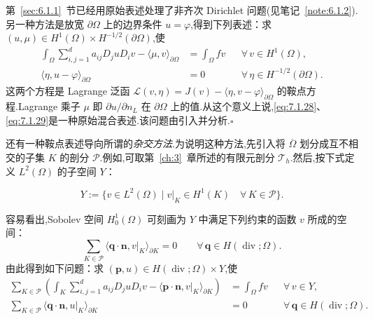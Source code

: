 \begin{note}
第~\ref{sec:6.1.1}~节已经用原始表述处理了非齐次 Dirichlet 问题(见笔记~\ref{note:6.1.2}).另一种方法是放宽 \(\partial\Omega\) 上的边界条件 \(u=\varphi\),得到下列表述：求 \((u,\mu)\in H^1(\Omega)\times H^{-1/2}(\partial\Omega)\),使
\begin{align}
  \int_\Omega\sum_{i,j=1}^d a_{ij}D_juD_iv-\langle\mu,v\rangle_{\partial\Omega}
    &=\int_\Omega fv &&\forall\,v\in H^1(\Omega),\label{eq:7.1.28}\\
  \langle\eta,u-\varphi\rangle_{\partial\Omega}
    &=0 &&\forall\,\eta\in H^{-1/2}(\partial\Omega).\label{eq:7.1.29}
\end{align}
这两个方程是 Lagrange 泛函 \(\mathcal L(v,\eta)=J(v)-\langle\eta,v-\varphi\rangle_{\partial\Omega}\) 的鞍点方程.Lagrange 乘子 \(\mu\) 即 \(\partial u/\partial n_L\) 在 \(\partial\Omega\) 上的值.从这个意义上说,\eqref{eq:7.1.28}、\eqref{eq:7.1.29}是一种原始混合表述.该问题由引入并分析.\hfill\(\square\)
\end{note}

还有一种鞍点表述导向所谓的\emph{杂交方法}.为说明这种方法,先引入将 \(\overline\Omega\) 划分成互不相交的子集 \(K\) 的剖分 \(\mathcal P\).例如,可取第~\ref{ch:3}~章所述的有限元剖分 \(\mathcal T_h\).然后,按下式定义 \(L^2(\Omega)\) 的子空间 \(Y\)：
\begin{definition*}
\begin{equation}\label{eq:7.1.30}
  Y:=\{v\in L^2(\Omega)\mid v|_K\in H^1(K)\quad\forall\,K\in\mathcal P\}.
\end{equation}
\end{definition*}
容易看出,Sobolev 空间 \(H_0^1(\Omega)\) 可刻画为 \(Y\) 中满足下列约束的函数 \(v\) 所成的空间：
\begin{equation}\label{eq:7.1.31}
  \sum_{K\in\mathcal P}\langle\boldsymbol{q}\cdot\boldsymbol{n},v|_K\rangle_{\partial K}
    =0\qquad\forall\,\boldsymbol{q}\in H(\operatorname{div};\Omega).
\end{equation}
由此得到如下问题：求 \((\boldsymbol{p},u)\in H(\operatorname{div};\Omega)\times Y\),使
\begin{align}
  \sum_{K\in\mathcal P}\left(\int_K\sum_{i,j=1}^d a_{ij}D_juD_iv
    -\langle\boldsymbol{p}\cdot\boldsymbol{n},v|_K\rangle_{\partial K}\right)
    &=\int_\Omega fv &&\forall\,v\in Y,\label{eq:7.1.32}\\
  \sum_{K\in\mathcal P}\langle\boldsymbol{q}\cdot\boldsymbol{n},u|_K\rangle_{\partial K}
    &=0 &&\forall\,\boldsymbol{q}\in H(\operatorname{div};\Omega).\label{eq:7.1.33}
\end{align}

